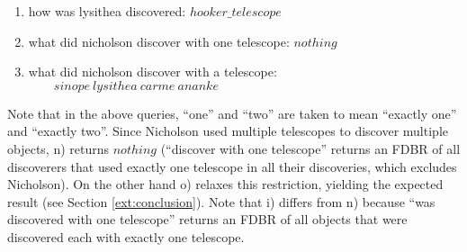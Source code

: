 \documentclass[../main.tex]{subfiles}
\begin{document}
\begin{refsection}
\begin{enumerate}[label=\alph*.]
	\item how was lysithea discovered: $\mathit{hooker\_telescope}$
	\item what did nicholson discover with one telescope: $\mathit{nothing}$
	\item what did nicholson discover with a telescope: \\ $\mathit{\qquad sinope\ lysithea\ carme\ ananke}$
\end{enumerate}
%
Note that in the above queries, ``one'' and ``two'' are taken to mean ``exactly one'' and ``exactly two''. Since Nicholson used multiple telescopes to discover multiple objects, n) returns $\mathit{nothing}$ (``discover with one telescope'' returns an FDBR of all discoverers that used exactly one telescope in all their discoveries, which excludes Nicholson). On the other hand o) relaxes this restriction, yielding the expected result (see Section \ref{ext:conclusion}).  Note that i) differs from n) because ``was discovered with one telescope'' returns an FDBR of all objects that were discovered each with exactly one telescope.


\end{refsection}
\end{document}
